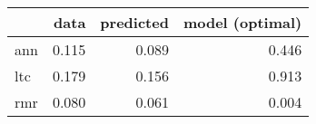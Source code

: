 \begin{tabular}{lrrr}
\toprule
{} &   data &  predicted &  model (optimal) \\
\midrule
ann &  0.115 &      0.089 &            0.446 \\
ltc &  0.179 &      0.156 &            0.913 \\
rmr &  0.080 &      0.061 &            0.004 \\
\bottomrule
\end{tabular}
